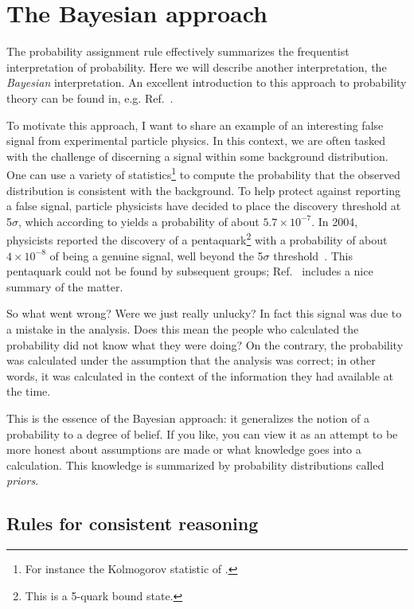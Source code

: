 \section{The Bayesian approach}\label{sec:bayes}

The probability assignment rule  effectively summarizes 
the frequentist interpretation of probability. Here we
will describe another interpretation, the {\it Bayesian} 
interpretation. An excellent introduction to this approach
to probability theory can be found in, e.g. Ref.~\cite{sivia_data_2006}.

To motivate this approach, I want to share an example of an interesting false
signal from experimental particle physics. In this context, we are often tasked
with the challenge of discerning a signal within some background distribution.
One can use a variety of statistics\footnote{For instance the Kolmogorov
statistic of .} to compute the probability that the observed
distribution is consistent with the background. To help protect against
reporting a false signal, particle physicists have decided to place the
discovery threshold at 5$\sigma$, which according to 
yields a probability of about $5.7\times10^{-7}$. In 2004, physicists
reported the discovery of a pentaquark\footnote{This is a
5-quark bound state.} with a probability of about
$4\times10^{-8}$ of being a genuine signal, well beyond the
5$\sigma$ threshold~\cite{aktas_evidence_2004}. This pentaquark could
not be found by subsequent groups; Ref.~\cite{rossi_tetra-quarks_2021}
includes a nice summary of the matter.

So what went wrong? Were we just really unlucky? In fact this signal was due to
a mistake in the analysis. Does this mean the people who calculated the
probability did not know what they were doing? On the contrary, the probability
was calculated under the assumption that the analysis was correct; in other
words, it was calculated in the context of the information they had available at
the time.

This is the essence of the Bayesian approach: it generalizes the notion of a 
probability to a degree of belief. If you like, you can view it as an attempt to
be more honest about assumptions are made or what knowledge goes into a
calculation. This knowledge is summarized by probability distributions called
{\it priors}.

\subsection{Rules for consistent reasoning}\label{sec:consistentReasoning}


